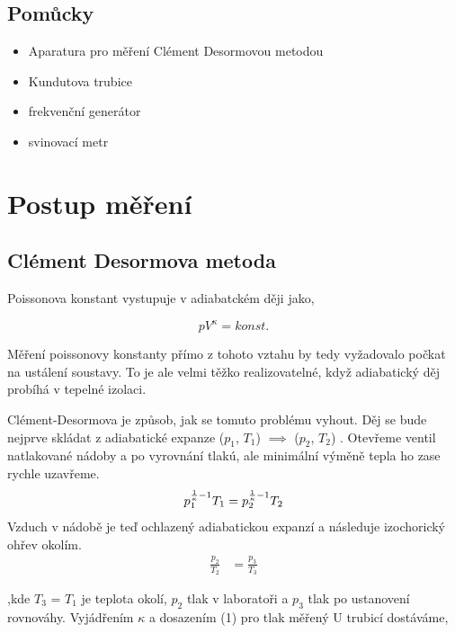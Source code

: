 \documentclass[a4paper,11pt]{article}
\begin{document}
\subsection{Pomůcky}

\begin{itemize}
  \item Aparatura pro měření Clément Desormovou metodou
  \item Kundutova trubice
  \item frekvenční generátor
  \item svinovací metr
\end{itemize}
 
\section{Postup měření}

\subsection{Clément Desormova metoda}

Poissonova konstant vystupuje v adiabatckém ději jako,

\begin{equation}
  pV^{\kappa} = konst.
\end{equation}

Měření poissonovy konstanty přímo z tohoto vztahu by tedy vyžadovalo počkat na ustálení soustavy.
To je ale velmi těžko realizovatelné, když adiabatický děj probíhá v tepelné izolaci.

Clément-Desormova je způsob, jak se tomuto problému vyhout. 
Děj se bude nejprve skládat z adiabatické expanze ($p_1$, $T_1$) $\implies$ ($p_2$, $T_2$) .
Otevřeme ventil natlakované nádoby a po vyrovnání tlakú, ale minimální výměně tepla ho zase rychle uzavřeme. \\
\begin{equation}
  p_1^{\frac{1}{\kappa} -1} T_1 = p_2^{\frac{1}{\kappa} -1} T_2 \\
\end{equation}
Vzduch v nádobě je teď ochlazený adiabatickou expanzí a následuje izochorický ohřev okolím. \\ 


\begin{align}
  \frac{p_2}{T_2} &= \frac{p_3}{T_3}
\end{align}

,kde $T_3$ = $T_1$ je teplota okolí, $p_2$ tlak v laboratoři a $p_3$ tlak po ustanovení rovnováhy. 
Vyjádřením $\kappa$ a dosazením (1) pro tlak měřený U trubicí dostáváme,
\end{document}
